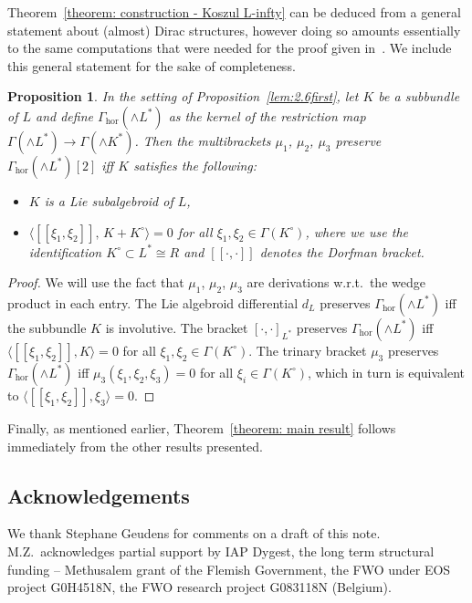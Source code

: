 \documentclass[pdftex]{sigma}
\numberwithin{equation}{section}
\newtheorem{Proposition}[Theorem]{Proposition}
 { \theoremstyle{definition}
\newtheorem{Definition}[Theorem]{Definition}
\newtheorem{Remark}[Theorem]{Remark} }
\newcommand{\hor}{\mathrm{hor}}
\newcommand{\oo}{[\![}
\newcommand{\cc}{]\!]}
\begin{document}
Theorem~\ref{theorem: construction - Koszul L-infty} can be deduced from a general statement about (almost) Dirac structures, however doing so amounts essentially to the same computations that were needed for the proof given in~\cite{SZPre}. We include this general statement for the sake of completeness.

\begin{Proposition}In the setting of Proposition~{\rm \ref{lem:2.6first}}, let $K$ be a subbundle of $L$ and define $\Gamma_{\hor}(\wedge L^*)$ as the kernel of the restriction map $\Gamma(\wedge L^*)\to \Gamma(\wedge K^*)$. Then the multibrackets $\mu_1$, $\mu_2$, $\mu_3$ preserve $\Gamma_{\hor}(\wedge L^*)[2]$ if{f} $K$ satisfies the following:
\begin{itemize}\itemsep=0pt
\item $K$ is a Lie subalgebroid of $L$,
\item $\langle \oo \xi_1 , \xi_2 \cc ,\, K+K^{\circ} \rangle=0$ for all $\xi_1 , \xi_2 \in \Gamma(K^{\circ})$, where we use the identification $K^{\circ}\subset L^*\cong R$ and $\oo \cdot,\cdot\cc$ denotes the Dorfman bracket.
\end{itemize}
\end{Proposition}
\begin{proof}We will use the fact that $\mu_1$, $\mu_2$, $\mu_3$ are derivations w.r.t.\ the wedge product in each entry. The Lie algebroid differential $d_L$ preserves $\Gamma_{\hor}(\wedge L^*) $ if{f} the subbundle $K$ is involutive. The bracket $[\cdot,\cdot]_{L^*}$ preserves $\Gamma_{\hor}(\wedge L^*) $ if{f} $\langle \oo \xi_1 , \xi_2 \cc, K\rangle=0$ for all $\xi_1 , \xi_2 \in \Gamma(K^{\circ})$. The trinary bracket $\mu_3$ preserves $\Gamma_{\hor}(\wedge L^*) $ if{f} $\mu_3(\xi_1,\xi_2,\xi_3)=0$ for all $\xi_i \in \Gamma(K^{\circ})$, which in turn is equivalent to $\langle \oo \xi_1 , \xi_2 \cc, \xi_3 \rangle=0$.
\end{proof}

Finally, as mentioned earlier, Theorem~\ref{theorem: main result} follows immediately from the other results presented.

\subsection*{Acknowledgements}We thank Stephane Geudens for comments on a draft of this note. M.Z.~acknowledges partial support by IAP Dygest, the long term structural funding -- Methusalem grant of the Flemish Government,
the FWO under EOS project G0H4518N, the FWO research project G083118N (Belgium).
\end{document}
